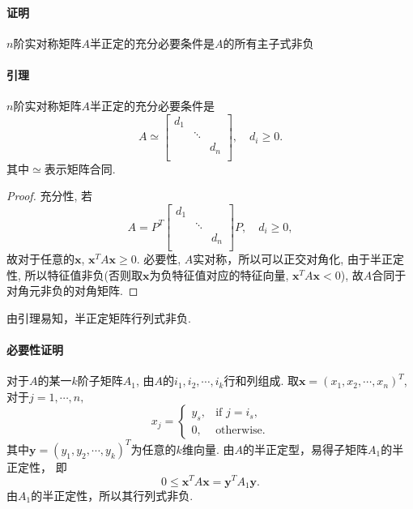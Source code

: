 \paragraph{证明}
$n$阶实对称矩阵$A$半正定的充分必要条件是$A$的所有主子式非负

\paragraph{引理}
$n$阶实对称矩阵$A$半正定的充分必要条件是
$$A \simeq \begin{bmatrix}
	d_1& &\\
	   &\ddots&\\
	   &&d_n\\
\end{bmatrix},
\quad
d_i \ge 0.$$
其中$\simeq$表示矩阵合同.
\begin{proof}
	充分性,
	若
	$$A = P^T\begin{bmatrix}
	d_1& &\\
	   &\ddots&\\
	   &&d_n\\
	\end{bmatrix}P,
	\quad
	d_i \ge 0,$$
	故对于任意的$\mathbf{x}$, $\mathbf{x}^T A \mathbf{x} \ge 0$.
	必要性, $A$实对称，所以可以正交对角化, 
	由于半正定性, 所以特征值非负(否则取$\mathbf{x}$为负特征值对应的特征向量, $\mathbf{x}^T A\mathbf{x}< 0$), 
	故$A$合同于对角元非负的对角矩阵.
\end{proof}

\begin{remark}
	由引理易知，半正定矩阵行列式非负.
\end{remark}

\paragraph{必要性证明}
对于$A$的某一$k$阶子矩阵$A_1$, 由$A$的$i_1,i_2,\cdots,i_k$行和列组成.
取$\mathbf{x}=(x_1,x_2,\cdots,x_n)^T$, 对于$j = 1,\cdots, n,$
\begin{equation}
\nonumber
x_j = \begin{cases}
	y_s,& \text{if } j = i_s,\\
	0, & \text{otherwise.}
\end{cases}
\end{equation}
其中$\mathbf{y} = (y_1, y_2, \cdots, y_k)^T$为任意的$k$维向量.
由$A$的半正定型，易得子矩阵$A_1$的半正定性， 即
\begin{equation}
\nonumber
0 \le \mathbf{x}^T A \mathbf{x} = \mathbf{y}^T A_1 \mathbf{y}.
\end{equation}
由$A_1$的半正定性，所以其行列式非负.

